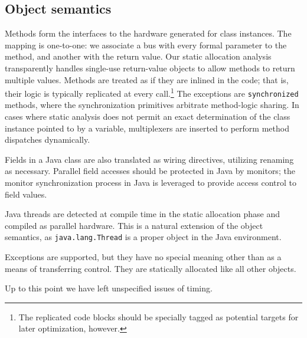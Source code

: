 \documentclass[11pt,notitlepage,twocolumn]{article}
\begin{document}
\subsection{Object semantics}
Methods form the interfaces to the hardware generated for class
instances.  The mapping is one-to-one: we associate a bus with
every formal parameter to the method, and another with the return
value.  Our static allocation analysis transparently handles
single-use return-value objects to allow methods to return multiple
values.  Methods are treated as if they are inlined in the code; that
is, their logic is typically replicated at every call.\footnote{The
replicated code blocks should be specially tagged as potential targets
for later optimization, however.}  The exceptions are
\texttt{synchronized} methods, where the synchronization primitives
arbitrate method-logic sharing.  In cases where static analysis does
not permit an exact determination of the class instance pointed to by
a variable, multiplexers are inserted to perform method dispatches
dynamically. 

Fields in a Java class are also translated as wiring directives,
utilizing renaming as necessary.  Parallel field accesses should be
protected in Java by monitors; the monitor synchronization process in
Java is leveraged to provide access control to field values.

Java threads are detected at compile time in the static allocation
phase and compiled as parallel hardware.  This is a natural extension
of the object semantics, as \texttt{java.lang.Thread} is a proper 
object in the Java environment.

Exceptions are supported, but they have no special meaning other than
as a means of transferring control.  They are statically allocated
like all other objects.

Up to this point we have left unspecified issues of timing.
\end{document}
